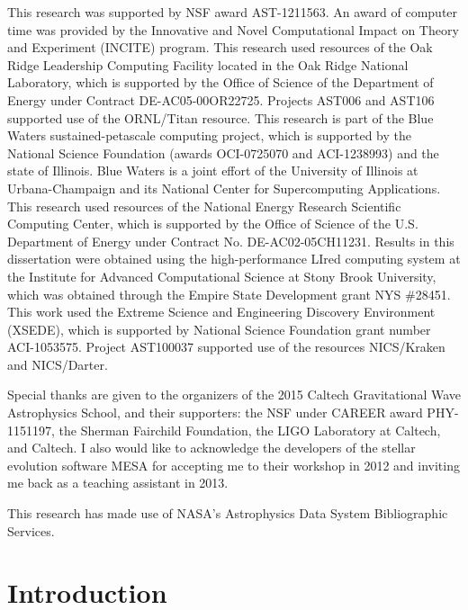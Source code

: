 \documentclass[12pt]{article}
\begin{document}
This research was supported by NSF award AST-1211563. An
award of computer time was provided by the Innovative and Novel
Computational Impact on Theory and Experiment (INCITE) program.  This
research used resources of the Oak Ridge Leadership Computing Facility
located in the Oak Ridge National Laboratory, which is supported by
the Office of Science of the Department of Energy under Contract
DE-AC05-00OR22725. Projects AST006 and AST106 supported use of the ORNL/Titan resource. 
This research is part of the Blue Waters sustained-petascale computing project, 
which is supported by the National Science Foundation (awards OCI-0725070 
and ACI-1238993) and the state of Illinois. Blue Waters is a joint 
effort of the University of Illinois at Urbana-Champaign and its 
National Center for Supercomputing Applications.
This research used resources of the National Energy Research Scientific Computing
Center, which is supported by the Office of Science of the
U.S. Department of Energy under Contract No. DE-AC02-05CH11231.
Results in this dissertation were obtained using the high-performance
LIred computing system at the Institute for Advanced Computational
Science at Stony Brook University, which was obtained through
the Empire State Development grant NYS \#28451. 
This work used the Extreme Science and Engineering Discovery Environment (XSEDE), 
which is supported by National Science Foundation grant number ACI-1053575. 
Project AST100037 supported use of the resources NICS/Kraken and NICS/Darter.

Special thanks are given to the organizers of the 2015 Caltech
Gravitational Wave Astrophysics School, and their supporters:
the NSF under CAREER award PHY-1151197, the Sherman Fairchild 
Foundation, the LIGO Laboratory at Caltech, and Caltech. I also
would like to acknowledge the developers of the stellar evolution
software MESA for accepting me to their workshop in 2012 and
inviting me back as a teaching assistant in 2013.

This research has made use of NASA's Astrophysics Data System 
Bibliographic Services.



\newpage
{}
\section{Introduction}
\label{sec:introduction}
\end{document}
